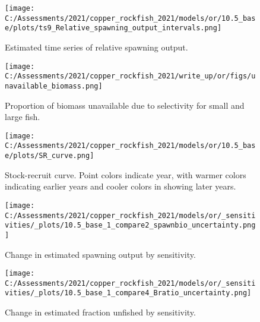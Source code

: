 \documentclass[11pt,
  english,
  a4paper,
]{article}
\begin{document}
\begin{figure}
\centering
\texttt{[image: C:/Assessments/2021/copper\_rockfish\_2021/models/or/10.5\_base/plots/ts9\_Relative\_spawning\_output\_intervals.png]}
\caption{Estimated time series of relative spawning output.\label{fig:depl}}
\end{figure}

\tagmcend\tagstructend

\clearpage


\begin{figure}
\centering
\texttt{[image: C:/Assessments/2021/copper\_rockfish\_2021/write\_up/or/figs/unavailable\_biomass.png]}
\caption{Proportion of biomass unavailable due to selectivity for small and large fish.\label{fig:unavail-bio}}
\end{figure}

\tagmcend\tagstructend


\begin{figure}
\centering
\texttt{[image: C:/Assessments/2021/copper\_rockfish\_2021/models/or/10.5\_base/plots/SR\_curve.png]}
\caption{Stock-recruit curve. Point colors indicate year, with warmer colors indicating earlier years and cooler colors in showing later years.\label{fig:bh-curve}}
\end{figure}

\tagmcend\tagstructend


\begin{figure}
\centering
\texttt{[image: C:/Assessments/2021/copper\_rockfish\_2021/models/or/\_sensitivities/\_plots/10.5\_base\_1\_compare2\_spawnbio\_uncertainty.png]}
\caption{Change in estimated spawning output by sensitivity.\label{fig:sens-ssb-1}}
\end{figure}

\tagmcend\tagstructend


\begin{figure}
\centering
\texttt{[image: C:/Assessments/2021/copper\_rockfish\_2021/models/or/\_sensitivities/\_plots/10.5\_base\_1\_compare4\_Bratio\_uncertainty.png]}
\caption{Change in estimated fraction unfished by sensitivity.\label{fig:sens-depl-1}}
\end{figure}
\end{document}
